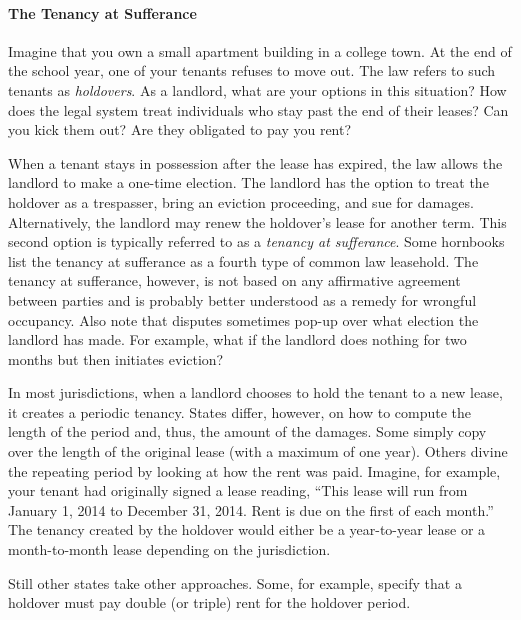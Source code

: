 \paragraph{The Tenancy at Sufferance}

Imagine that you own a small apartment building in a college town.  At the
end of the school year, one of your tenants refuses to move out.  The law
refers to such tenants as \textit{holdovers}.  As a landlord, what are your
options in this situation?  How does the legal system treat individuals who
stay past the end of their leases?  Can you kick them out? Are they obligated
to pay you rent?

When a tenant stays in possession after the lease has expired, the law allows
the landlord to make a one-time election.  The landlord has the option to treat
the holdover as a trespasser, bring an eviction proceeding, and sue for
damages.  Alternatively, the landlord may renew the holdover's lease for
another term.  This second option is typically referred to as a \textit{tenancy
at sufferance}.  Some hornbooks list the tenancy at sufferance as a fourth type
of common law leasehold.  The tenancy at sufferance, however, is not based on
any affirmative agreement between parties and is probably better understood as
a remedy for wrongful occupancy.  Also note that disputes sometimes pop-up over
what election the landlord has made.  For example, what if the landlord does
nothing for two months but then initiates eviction?  

In most jurisdictions, when a landlord chooses to hold the tenant to a new
lease, it creates a periodic tenancy.  States differ, however, on how to
compute the length of the period and, thus, the amount of the damages.  Some
simply copy over the length of the original lease (with a maximum of one year).
Others divine the repeating period by looking at how the rent was paid. 
Imagine, for example, your tenant had originally signed a lease reading, ``This
lease will run from January 1, 2014 to December 31, 2014.  Rent is due on the
first of each month.''  The tenancy created by the holdover would either be a
year-to-year lease or a month-to-month lease depending on the jurisdiction.

Still other states take other approaches.  Some, for example, specify that a
holdover must pay double (or triple) rent for the holdover period.  

